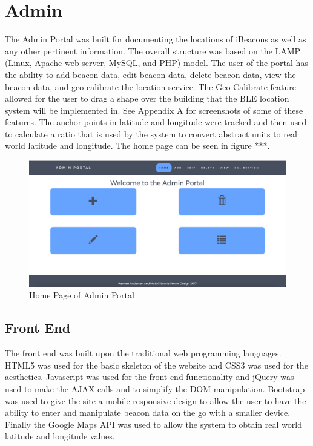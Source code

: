 \section{Admin}
The Admin Portal was built for documenting the locations of iBeacons as well as any other pertinent information. The overall
structure was based on the LAMP (Linux, Apache web server, MySQL, and PHP) model. The user of the portal has the ability to add beacon data, edit beacon data,
delete beacon data, view the beacon data, and geo calibrate the location service. The Geo Calibrate feature allowed for the
user to drag a shape over the building that the BLE location system will be implemented in. See Appendix A for screenshots of some of these features. The anchor points in latitude
and longitude were tracked and then used to calculate a ratio that is used by the system to convert abstract units to
real world latitude and longitude. The home page can be seen in figure ***.

\begin{figure}[h]
\includegraphics[width=1\textwidth]{images/homeAdmin.png}
\caption{Home Page of Admin Portal}
\end{figure}

\subsection{Front End}
The front end was built upon the traditional web programming languages. HTML5 was used for the basic skeleton of the website
and CSS3 was used for the aesthetics. Javascript was used for the front end functionality and jQuery was used to make the AJAX calls
and to simplify the DOM manipulation. Bootstrap was used to give the site a mobile responsive design to allow the user to have the ability
to enter and manipulate beacon data on the go with a smaller device. Finally the Google Maps API was used to allow the system to obtain
real world latitude and longitude values.

